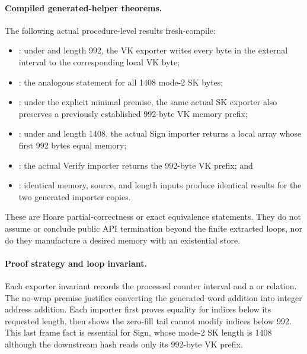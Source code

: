 \paragraph{Compiled generated-helper theorems.}
The following actual procedure-level results fresh-compile:
\begin{itemize}
  \item {}: under
         and length 992, the VK exporter writes
        every byte in the external interval to the corresponding local VK
        byte;
  \item {}: the analogous statement
        for all 1408 mode-2 SK bytes;
  \item {}: under the
        explicit minimal  premise, the same
        actual SK exporter also preserves a previously established 992-byte
        VK memory prefix;
  \item {}: under
         and length 1408, the actual Sign
        importer returns a local array whose first 992 bytes equal memory;
  \item {}: the actual Verify
        importer returns the 992-byte VK prefix; and
  \item {}: identical memory,
        source, and length inputs produce identical results for the two
        generated importer copies.
\end{itemize}
These are Hoare partial-correctness or exact equivalence statements.  They do
not assume or conclude public API termination beyond the finite extracted
loops, nor do they manufacture a desired memory with an existential store.

\paragraph{Proof strategy and loop invariant.}
Each exporter invariant records the processed counter interval and a
 or  relation.  The
no-wrap premise justifies converting the generated word addition into integer
address addition.  Each importer first proves equality for indices below its
requested length, then shows the zero-fill tail cannot modify indices below
992.  This last frame fact is essential for Sign, whose mode-2 SK length is
1408 although the downstream hash reads only its 992-byte VK prefix.

